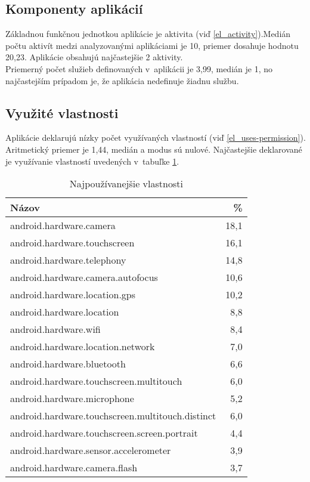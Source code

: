 \subsection{Komponenty aplikácií}
Základnou funkčnou jednotkou aplikácie je aktivita (viď \ref{el_activity}).Medián počtu aktivít medzi analyzovanými aplikáciami je  10, priemer dosahuje hodnotu 20,23. Aplikácie obsahujú najčastejšie 2 aktivity.\\Priemerný počet služieb definovaných v~aplikácii je 3,99, medián je 1, no najčastejším prípadom je, že aplikácia nedefinuje žiadnu službu.

\subsection{Využité vlastnosti}
Aplikácie deklarujú nízky počet využívaných vlastností (viď \ref{el_uses-permission}). Aritmetický priemer je 1,44, medián a modus sú nulové. Najčastejšie deklarované je využívanie vlastností uvedených v~tabuľke \ref{tab:features}.
\begin{table}[htb]
\centering
  \begin{tabular}{|l r|}
    \hline
    \textbf{Názov} & \textbf{\%} \\\hline\hline
    android.hardware.camera & 18,1 \\
    android.hardware.touchscreen & 16,1 \\
    android.hardware.telephony & 14,8 \\
    android.hardware.camera.autofocus & 10,6 \\
    android.hardware.location.gps & 10,2 \\
    android.hardware.location & 8,8 \\
    android.hardware.wifi & 8,4 \\
    android.hardware.location.network & 7,0\\
    android.hardware.bluetooth & 6,6\\
    android.hardware.touchscreen.multitouch & 6,0\\
    android.hardware.microphone & 5,2\\
    android.hardware.touchscreen.multitouch.distinct & 6,0\\
    android.hardware.touchscreen.screen.portrait & 4,4\\
    android.hardware.sensor.accelerometer & 3,9\\
    android.hardware.camera.flash & 3,7\\
    \hline
  \end{tabular}
  \caption{Najpoužívanejšie vlastnosti}
  \label{tab:features}
\end{table}

